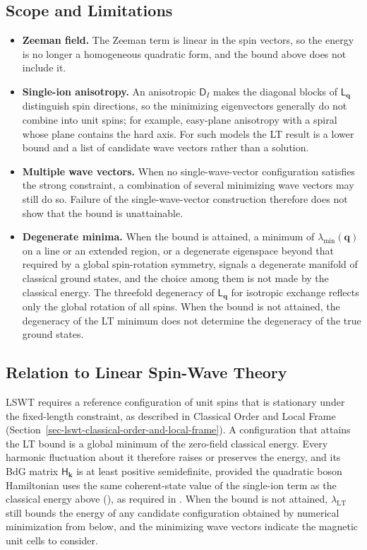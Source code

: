 \subsection{Scope and Limitations}

\begin{itemize}
\tightlist
\item
  \textbf{Zeeman field.} The Zeeman term is linear in the spin vectors, so the energy is no longer a homogeneous quadratic form, and the bound above does not include it.
\item
  \textbf{Single-ion anisotropy.} An anisotropic \(\mathsf D_I\) makes the diagonal blocks of \(\mathsf L_{\mathbf q}\) distinguish spin directions, so the minimizing eigenvectors generally do not combine into unit spins; for example, easy-plane anisotropy with a spiral whose plane contains the hard axis. For such models the LT result is a lower bound and a list of candidate wave vectors rather than a solution.
\item
  \textbf{Multiple wave vectors.} When no single-wave-vector configuration satisfies the strong constraint, a combination of several minimizing wave vectors may still do so. Failure of the single-wave-vector construction therefore does not show that the bound is unattainable.
\item
  \textbf{Degenerate minima.} When the bound is attained, a minimum of \(\lambda_{\min}(\mathbf q)\) on a line or an extended region, or a degenerate eigenspace beyond that required by a global spin-rotation symmetry, signals a degenerate manifold of classical ground states, and the choice among them is not made by the classical energy. The threefold degeneracy of \(\mathsf L_{\mathbf q}\) for isotropic exchange reflects only the global rotation of all spins. When the bound is not attained, the degeneracy of the LT minimum does not determine the degeneracy of the true ground states.
\end{itemize}

\subsection{Relation to Linear Spin-Wave Theory}

LSWT requires a reference configuration of unit spins that is stationary under the fixed-length constraint, as described in Classical Order and Local Frame (Section~\ref{sec-lswt-classical-order-and-local-frame}). A configuration that attains the LT bound is a global minimum of the zero-field classical energy. Every harmonic fluctuation about it therefore raises or preserves the energy, and its BdG matrix \(\mathsf H_{\mathbf k}\) is at least positive semidefinite, provided the quadratic boson Hamiltonian uses the same coherent-state value of the single-ion term as the classical energy above (), as required in . When the bound is not attained, \(\lambda_{\mathrm{LT}}\) still bounds the energy of any candidate configuration obtained by numerical minimization from below, and the minimizing wave vectors indicate the magnetic unit cells to consider.

